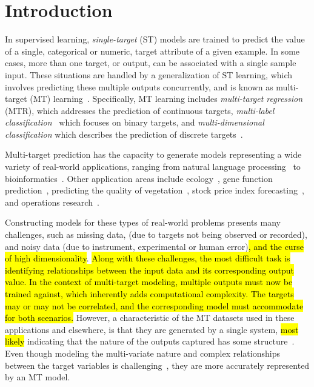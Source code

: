 \documentclass[preprint,12pt]{elsarticle}
\begin{document}
\section{Introduction}
In supervised learning, \textit{single-target} (ST) models are trained to predict the value of a single, categorical or numeric, target attribute of a given example. In some cases, more than one target, or output, can be associated with a single sample input. These situations are handled by a generalization of ST learning, which involves predicting these multiple outputs concurrently, and is known as multi-target (MT) learning~\cite{Aho2012,Borchani2015}. Specifically, MT learning includes \textit{multi-target regression} (MTR), which addresses the prediction of continuous targets, \textit{multi-label classification}~\cite{Zhang20141819} which focuses on binary targets, and \textit{multi-dimensional classification} which describes the prediction of discrete targets~\cite{Borchani2015,Read20141720}. 

Multi-target prediction has the capacity to generate models representing a wide variety of real-world applications, ranging from natural language processing~\cite{Jeong2009} to bioinformatics~\cite{Lui2010}. Other application areas include ecology~\cite{Aho2012}, gene function prediction~\cite{Kocev2015}, predicting the quality of vegetation~\cite{Hadavandi2015-2,Kocev2010}, stock price index forecasting~\cite{Xiong2014}, and operations research~\cite{Borchani2015,Hadavandi2015}. 

Constructing models for these types of real-world problems presents many challenges, such as missing data, (due to targets not being observed or recorded), and noisy data (due to instrument, experimental or human error)\hl{, and the curse of high dimensionality}. \hl{Along with these challenges, the most difficult task is identifying relationships between the input data and its corresponding output value. In the context of multi-target modeling, multiple outputs must now be trained against, which inherently adds computational complexity. The targets may or may not be correlated, and the corresponding model must accommodate for both scenarios.} However, a characteristic of the MT datasets used in these applications and elsewhere, is that they are generated by a single system, \hl{most likely} indicating that the nature of the outputs captured has some structure~\cite{Hadavandi2015}. Even though modeling the multi-variate nature and complex relationships between the target variables is challenging~\cite{Borchani2015}, they are more accurately represented by an MT model.%
\end{document}
